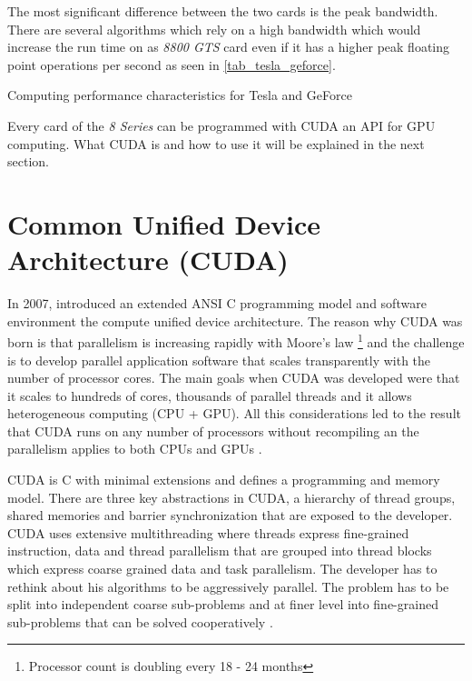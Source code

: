 The most significant difference between the two cards is the peak bandwidth. There
are several algorithms which rely on a high bandwidth which would increase the
run time on as \emph{8800 GTS} card even if it has a higher peak floating
point operations per second as seen in  \autoref{tab_tesla_geforce}. 

\begin{table}[ht]
	\centering
  	\caption{Computing performance characteristics for Tesla and GeForce}
  	\label{tab:tesla_geforce}
\end{table}

Every card of the \emph{8 Series} can be programmed with \gls{CUDA} an
\gls{API} for \gls{GPU} computing. What \gls{CUDA} is and how to use it will 
be explained in the next section. 


\section{Common Unified Device Architecture (CUDA)}%
\label{sub:common_unified_device_architecture_cuda_} 
In 2007, {} introduced an extended \gls{ANSI} C programming model and
software environment the compute unified device architecture. The reason why
\gls{CUDA} was born is that parallelism is increasing rapidly with Moore's law
\footnote{Processor count is doubling every 18 - 24 months} and the challenge is
to develop parallel application software that scales transparently with the
number of processor cores. The main goals when \gls{CUDA} was developed were
that it scales to hundreds of cores, thousands of parallel threads and it allows
heterogeneous computing (\gls{CPU} + \gls{GPU}). All this considerations led to
the result that \gls{CUDA} runs on any number of processors without recompiling
an the parallelism applies to both \glspl{CPU} and \glspl{GPU} 
\citep{citeulike:3839013}.

\Gls{CUDA} is C with minimal extensions and defines a programming and memory model.
There are three key abstractions in \gls{CUDA}, a hierarchy of thread groups, shared
memories and barrier synchronization \citep{citeulike:3325943} that are exposed
to the developer. \Gls{CUDA} uses extensive multithreading where threads express
fine-grained instruction, data and thread parallelism that are grouped into
thread blocks which express coarse grained data and task parallelism. The
developer has to rethink about his algorithms to be aggressively parallel.
The problem has to be split into independent coarse sub-problems and at finer
level into fine-grained sub-problems that can be solved cooperatively
\citep{citeulike:3325943}.

